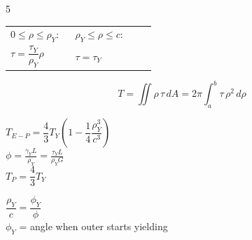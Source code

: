 \documentclass[8pt]{extarticle}
\begin{document}
\begin{multicols*}{5}
{\footnotesize\begin{tabular}{@{}p{0.4\linewidth}p{0.5\linewidth}@{}}
$0 \le \rho \le \rho_Y$: & $\rho_Y \le \rho \le c$: \\[3pt]
{\scriptsize$\tau = \dfrac{\tau_Y}{\rho_Y}\rho$} &
{\scriptsize$\tau = \tau_Y$} \\[6pt]
\end{tabular}}

{\footnotesize\[
T = \iint \rho\,\tau\,dA = 2\pi\int_{a}^{b}\tau\,\rho^2\,d\rho
\]}

$T_{E-P} = \dfrac{4}{3}T_Y\left(1 - \dfrac{1}{4}\dfrac{\rho_Y^3}{c^3}\right)$\\
$\phi = \frac{\gamma_Y L}{\rho_Y} = \frac{\tau_Y L}{\rho_Y G}$\\
$T_P = \dfrac{4}{3}T_Y$


$\dfrac{\rho_Y}{c} = \dfrac{\phi_Y}{\phi}$ \\
{\footnotesize $\phi_Y$ = angle when outer starts yielding}






\end{multicols*}
\end{document}

